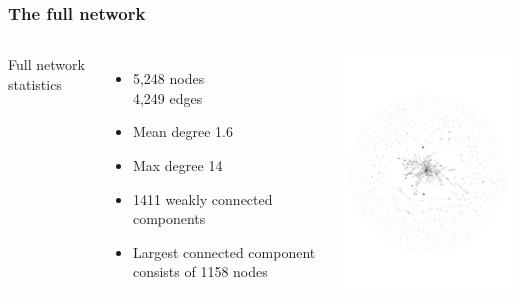 \documentclass[xcolor=dvipsnames, 9pt]{beamer}
\begin{document}
\begin{frame}[fragile]
    \frametitle{The full network}
    \begin{columns}
        Full network statistics
        \scriptsize{\begin{itemize}
            \item 5,248 nodes\\4,249 edges
            \item Mean degree 1.6
            \item Max degree 14
            \item 1411 weakly connected components
            \item Largest connected component consists of 1158 nodes
        \end{itemize}}
            \centering
            \includegraphics[width=7.5cm,clip,trim=0.5cm 4.5cm 0.5cm 4.5cm]{../images/ssrn_weighted.pdf}
    \end{columns}
\end{frame}
\end{document}
